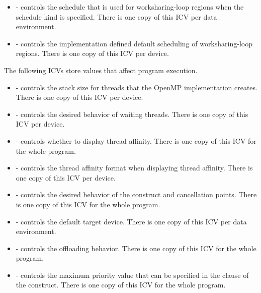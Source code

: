 \begin{itemize}
\item {} - controls the schedule that is used for 
      worksharing-loop regions when the  schedule kind is
      specified. There is one copy of this ICV per data environment.

\item {} - controls the implementation defined default scheduling 
      of worksharing-loop regions. There is one copy of this ICV per device.
\end{itemize}

The following ICVs store values that affect program execution.

\begin{itemize}
\item {} - controls the stack size for threads that the OpenMP 
      implementation creates. There is one copy of this ICV per device.

\item {} - controls the desired behavior of waiting threads. 
      There is one copy of this ICV per device.

\item {} - controls whether to display thread affinity. 
      There is one copy of this ICV for the whole program.

\item {} - controls the thread affinity format when displaying 
      thread affinity. There is one copy of this ICV per device.

\item {} - controls the desired behavior of the  construct 
      and cancellation points. There is one copy of this ICV for the whole program.

\item {} - controls the default target device. There is one copy 
      of this ICV per data environment.

\item {} - controls the offloading behavior. There is one copy 
      of this ICV for the whole program.

\item {} - controls the maximum priority value that can be 
      specified in the  clause of the  construct. There is 
      one copy of this ICV for the whole program.

\end{itemize}

